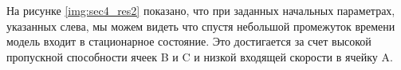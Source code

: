 
На рисунке \ref{img:sec4_res2} показано, что при заданных начальных параметрах, указанных слева, мы можем видеть что спустя небольшой промежуток времени модель входит в стационарное состояние. Это достигается за счет высокой пропускной способности ячеек B и C и низкой входящей скорости в ячейку A.


\clearpage